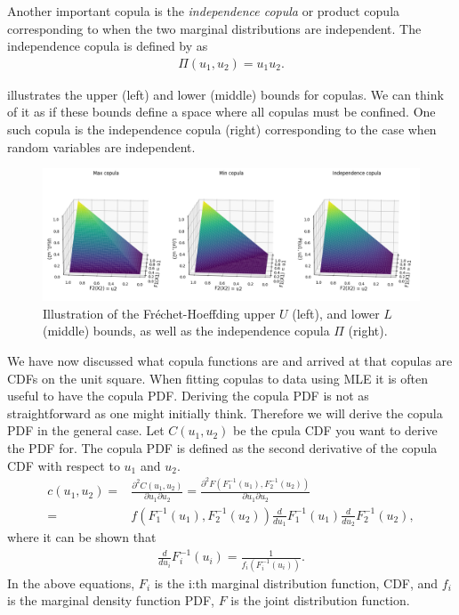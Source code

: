 Another important copula is the \emph{independence copula} or product copula corresponding to when the two marginal distributions are independent. The independence copula is defined by  as
\begin{align*}
    \Pi(u_1,u_2) = u_1u_2.
\end{align*}

 illustrates the upper (left) and lower (middle) bounds for copulas. We can think of it as if these bounds define a space where all copulas must be confined. One such copula is the independence copula (right) corresponding to the case when random variables are independent. 

\begin{figure}
    \centering
    \includegraphics[width=1.\linewidth]{3Theory/pictures/FrechetBounds.png}
    \caption{Illustration of the Fréchet-Hoeffding upper $U$ (left), and lower $L$ (middle) bounds, as well as the independence copula $\Pi$ (right).}
    \label{fig:FrechetBounds}
\end{figure}

We have now discussed what copula functions are and arrived at that copulas are \gls{CDF}s on the unit square. When fitting copulas to data using \gls{MLE} it is often useful to have the copula \gls{PDF}. Deriving the copula \gls{PDF} is not as straightforward as one might initially think. Therefore we will derive the copula \gls{PDF} in the general case. Let $C(u_1,u_2)$ be the cpula \gls{CDF} you want to derive the \gls{PDF} for. The copula \gls{PDF} is defined as the second derivative of the copula \gls{CDF} with respect to $u_1$ and $u_2$.
\begin{align*}
    c(u_1,u_2) =& \frac{\partial^2C(u_1,u_2)}{\partial u_1\partial u_2} = 
    \frac{\partial^2F(F_1^{-1}(u_1),F_2^{-1}(u_2))}{\partial u_1\partial u_2}\\
    =&  f(F_1^{-1}(u_1),F_2^{-1}(u_2)) \frac{d}{du_1} F_1^{-1}(u_1)  \frac{d}{du_2} F_2^{-1}(u_2),
\end{align*}
where it can be shown that 
\begin{align*}
    \frac{d}{du_i} F_i^{-1}(u_i) = \frac{1}{f_i(F_i^{-1}(u_i))}.
\end{align*}
In the above equations, $F_i$ is the i:th marginal distribution function, \gls{CDF}, and $f_i$ is the marginal density function \gls{PDF}, $F$ is the joint distribution function.   

